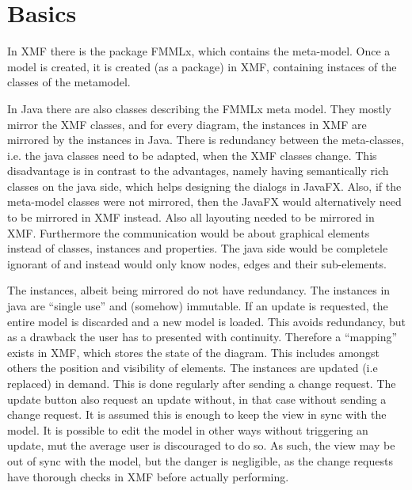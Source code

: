 \documentclass [11pt,letterpaper,twoside,openright]{book}
\begin{document}
\section{Basics}
In XMF there is the package FMMLx, which contains the meta-model. Once a model is created, it is created (as a package) in XMF, containing instaces of the classes of the metamodel. 

In Java there are also classes describing the FMMLx meta model. They mostly mirror the XMF classes, and for every diagram, the instances in XMF are mirrored by the instances in Java. There is redundancy between the meta-classes, i.e. the java classes need to be adapted, when the XMF classes change. This disadvantage is in contrast to the advantages, namely having semantically rich classes on the java side, which helps designing the dialogs in JavaFX. Also, if the meta-model classes were not mirrored, then the JavaFX would alternatively need to be mirrored in XMF instead. Also all layouting needed to be mirrored in XMF. Furthermore the communication would be about graphical elements instead of classes, instances and properties. The java side would be completele ignorant of {\FMMLx} and instead would only know nodes, edges and their sub-elements. 

The instances, albeit being mirrored do not have redundancy. The instances in java are ``single use'' and (somehow) immutable. If an update is requested, the entire model is discarded and a new model is loaded. 
This avoids redundancy, but as a drawback the user has to presented with continuity. 
Therefore a ``mapping'' exists in XMF, which stores the state of the diagram. This includes amongst others the position and visibility of elements.
The instances are updated (i.e replaced) in demand. This is done regularly after sending a change request. 
The update button also request an update without, in that case without sending a change request. 
It is assumed this is enough to keep the view in sync with the model. It is possible to edit the model in other ways without triggering an update, mut the average user is discouraged to do so. As such, the view may be out of sync with the model, but the danger is negligible, as the change requests have thorough checks in XMF before actually performing. 
\end{document}
